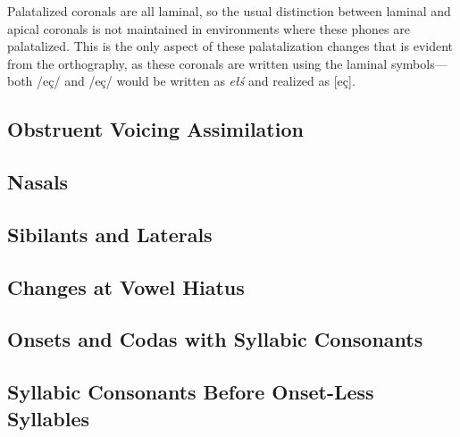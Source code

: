 \documentclass[a4paper,11pt,oneside,openany]{memoir}
\newcommand{\bripa}[1]{[#1]}
\newcommand{\phipa}[1]{/#1/}
\begin{document}
\begin{center}
\end{center}
\noindent Palatalized coronals are all laminal, so the usual distinction between laminal and apical coronals is not maintained in environments where these phones are palatalized. This is the only aspect of these palatalization changes that is evident from the orthography, as these coronals are written using the laminal symbols---both \phipa{e\latfric\lamino ç} and \phipa{e\latfric\apico ç} would be written as \textit{e\l\'s} and realized as \bripa{e\latfric\lamino\pal ç}.

\subsection{Obstruent Voicing Assimilation}

\subsection{Nasals}

\subsection{Sibilants and Laterals}

\subsection{Changes at Vowel Hiatus}

\subsection{Onsets and Codas with Syllabic Consonants}

\subsection{Syllabic Consonants Before Onset-Less Syllables}
\end{document}

